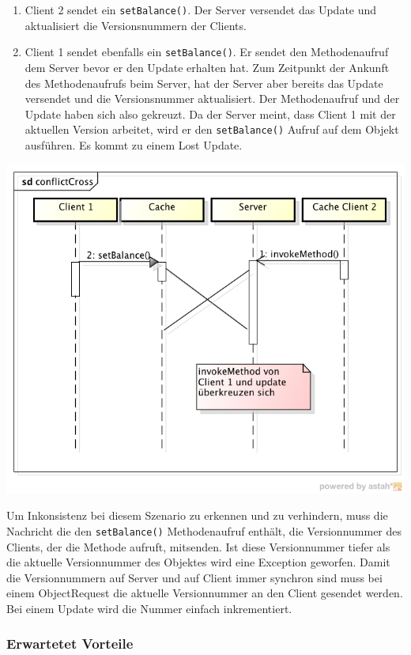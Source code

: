 \begin{enumerate}
\item Client 2 sendet ein \verb|setBalance()|. Der Server versendet das Update und aktualisiert die Versionsnummern der Clients.
\item Client 1 sendet ebenfalls ein \verb|setBalance()|. Er sendet den Methodenaufruf dem Server bevor er den Update erhalten hat. Zum Zeitpunkt der Ankunft des Methodenaufrufs beim Server, hat der Server aber bereits das Update versendet und die Versionsnummer aktualisiert. Der Methodenaufruf und der Update haben sich also gekreuzt. Da der Server meint, dass Client 1 mit der aktuellen Version arbeitet, wird er den \verb|setBalance()| Aufruf auf dem Objekt ausführen. Es kommt zu einem Lost Update.
\end{enumerate}

\includegraphics[scale=0.3]{images_objectcaching/conflictCross}

Um Inkonsistenz bei diesem Szenario zu erkennen und zu verhindern, muss die Nachricht die den \verb|setBalance()| Methodenaufruf enthält, die Versionnummer des Clients, der die Methode aufruft, mitsenden. Ist diese Versionnummer tiefer als die aktuelle Versionnummer des Objektes wird eine Exception geworfen. Damit die Versionnummern auf Server und auf Client immer synchron sind muss bei einem ObjectRequest die aktuelle Versionnummer an den Client gesendet werden. Bei einem Update wird die Nummer einfach inkrementiert.

\subsubsection{Erwartetet Vorteile}
\label{sec:erwartetet-vorteile}

